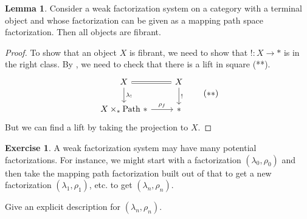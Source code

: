 \documentclass{article}
\theoremstyle{definition}
\newtheorem{lemma}[definition]{Lemma}
\newtheorem{exercise}[definition]{Exercise}
\newcommand{\Path}{\mathrm {Path} \ }
\begin{document}
\begin{lemma}
    Consider a weak factorization system on a category with a terminal object and whose factorization can be given as a mapping path space factorization. Then all objects are fibrant.
\end{lemma}
\begin{proof}
    To show that an object $X$ is fibrant, we need to show that $!: X \to *$ is in the right class. By  , we need to check that there is a lift in square (**).
    \[
        \begin{tikzcd}
            X \ar[r,equal] \ar[d,"\lambda_!"] & X \ar[d,"!"]
            \\ 
            X \times_* \Path * \ar[r,"\rho_f"] & *
        \end{tikzcd}
        \tag{$**$}
   \]
   But we can find a lift by taking the projection to $X$.
\end{proof}



\begin{exercise}
    A weak factorization system may have many potential factorizations. For instance, we might start with a factorization $(\lambda_0, \rho_0)$ and then take the mapping path factorization built out of that to get a new factorization $(\lambda_1, \rho_1)$, etc. to get $(\lambda_n, \rho_n)$.

    Give an explicit description for $(\lambda_n, \rho_n)$.
\end{exercise}





\end{document}
